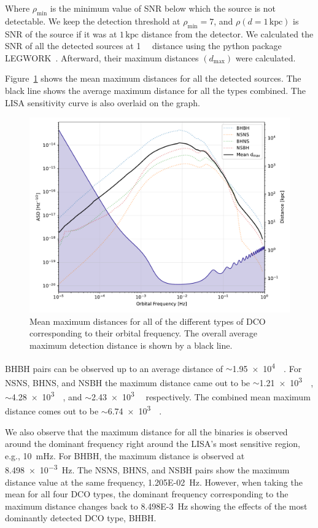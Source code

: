 \documentclass[journal, twocolumns]{IEEEtran}
\newcommand{\kpc}{\kilo\parsec}
\newcommand{\scientific}[2]{\SI[scientific-notation=engineering, exponent-to-prefix]{#1}{#2}}
\begin{document}
    Where $\rho_{\min}$ is the minimum value of SNR below which the source is not detectable.
    We keep the detection threshold at $\rho_{\min}=7$, and $\rho(d=1\,\text{kpc})$ is SNR of the source if it was at $1\,\text{kpc}$ distance from the detector.
    We calculated the SNR of all the detected sources at \SI{1}{\kpc} distance using the python package LEGWORK~\cite{Wagg2021LW}.
    Afterward, their maximum distances $(d_{\max})$ were calculated.

    Figure~\ref{fig:dmax} shows the mean maximum distances for all the detected sources.
    The black line shows the average maximum distance for all the types combined.
    The LISA sensitivity curve is also overlaid on the graph.

    \begin{figure}[!h]
        \centering
        \includegraphics[width=\linewidth]{analysis_data/004__images_for_latex/d_max}
        \caption{Mean maximum distances for all of the different types of DCO corresponding to their orbital frequency. The overall average maximum detection distance is shown by a black line.}
        \label{fig:dmax}
    \end{figure}

    BHBH pairs can be observed up to an average distance of $\sim$\scientific{1.95e4}{\kpc}.
    For NSNS, BHNS, and NSBH the maximum distance came out to be $\sim$\scientific{1.21e3}{\kpc}, $\sim$\scientific{4.28e3}{\kpc}, and $\sim$\scientific{2.43e3}{\kpc} respectively.
    The combined mean maximum distance comes out to be $\sim$\scientific{6.74e3}{\kpc}.

    We also observe that the maximum distance for all the binaries is observed around the dominant frequency right around the LISA's most sensitive region, e.g., \scientific{10}{\milli\hertz}.
    For BHBH, the maximum distance is observed at \scientific{8.498e-3}{\hertz}.
    The NSNS, BHNS, and NSBH pairs show the maximum distance value at the same frequency, \scientific{1.205E-02}{\hertz}.
    However, when taking the mean for all four DCO types, the dominant frequency corresponding to the maximum distance changes back to \scientific{8.498E-3}{\hertz} showing the effects of the most dominantly detected DCO type, BHBH\@.
\end{document}

